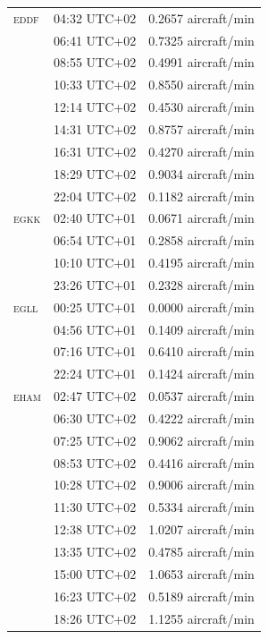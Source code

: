 \documentclass[]{elsarticle}
\newcommand{\airp}[1]{\textcolor{#1}{\textsc{#1}}}
\begin{document}
\begin{center}
\begin{longtable}{lll}
      \airp{eddf} & 04:32 UTC+02 &  0.2657 aircraft/min \\
           & 06:41 UTC+02 &  0.7325 aircraft/min \\
           & 08:55 UTC+02 &  0.4991 aircraft/min \\
           & 10:33 UTC+02 &  0.8550 aircraft/min \\
           & 12:14 UTC+02 &  0.4530 aircraft/min \\
           & 14:31 UTC+02 &  0.8757 aircraft/min \\
           & 16:31 UTC+02 &  0.4270 aircraft/min \\
           & 18:29 UTC+02 &  0.9034 aircraft/min \\
           & 22:04 UTC+02 &  0.1182 aircraft/min \\
      \airp{egkk} & 02:40 UTC+01 &  0.0671 aircraft/min \\
           & 06:54 UTC+01 &  0.2858 aircraft/min \\
           & 10:10 UTC+01 &  0.4195 aircraft/min \\
           & 23:26 UTC+01 &  0.2328 aircraft/min \\
      \airp{egll} & 00:25 UTC+01 &  0.0000 aircraft/min \\
           & 04:56 UTC+01 &  0.1409 aircraft/min \\
           & 07:16 UTC+01 &  0.6410 aircraft/min \\
           & 22:24 UTC+01 &  0.1424 aircraft/min \\
      \airp{eham} & 02:47 UTC+02 &  0.0537 aircraft/min \\
           & 06:30 UTC+02 &  0.4222 aircraft/min \\
           & 07:25 UTC+02 &  0.9062 aircraft/min \\
           & 08:53 UTC+02 &  0.4416 aircraft/min \\
           & 10:28 UTC+02 &  0.9006 aircraft/min \\
           & 11:30 UTC+02 &  0.5334 aircraft/min \\
           & 12:38 UTC+02 &  1.0207 aircraft/min \\
           & 13:35 UTC+02 &  0.4785 aircraft/min \\
           & 15:00 UTC+02 &  1.0653 aircraft/min \\
           & 16:23 UTC+02 &  0.5189 aircraft/min \\
           & 18:26 UTC+02 &  1.1255 aircraft/min \\

\end{longtable}
\end{center}
\end{document}
